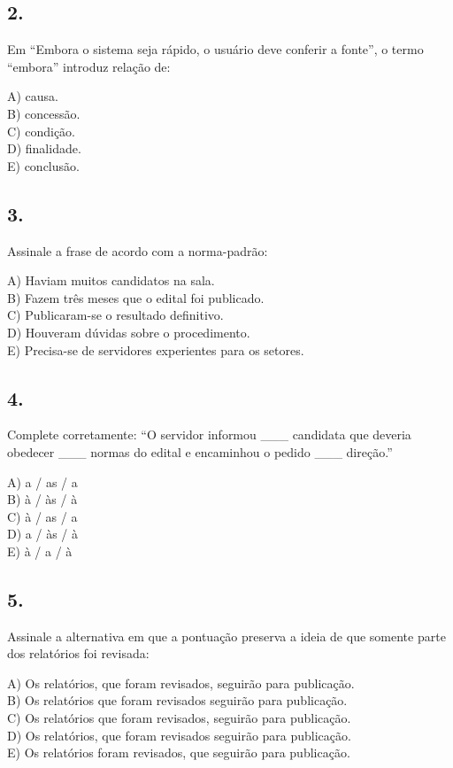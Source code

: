 \documentclass[11pt,a4paper]{article}
\begin{document}
\subsection*{2.}

Em “Embora o sistema seja rápido, o usuário deve conferir a fonte”, o termo “embora” introduz relação de:

A) causa. \\ B) concessão. \\ C) condição. \\ D) finalidade. \\ E) conclusão.

\subsection*{3.}

Assinale a frase de acordo com a norma-padrão:

A) Haviam muitos candidatos na sala. \\ B) Fazem três meses que o edital foi publicado. \\ C) Publicaram-se o resultado definitivo. \\ D) Houveram dúvidas sobre o procedimento. \\ E) Precisa-se de servidores experientes para os setores.

\subsection*{4.}

Complete corretamente: “O servidor informou \_\_\_ candidata que deveria obedecer \_\_\_ normas do edital e encaminhou o pedido \_\_\_ direção.”

A) a / as / a \\ B) à / às / à \\ C) à / as / a \\ D) a / às / à \\ E) à / a / à

\subsection*{5.}

Assinale a alternativa em que a pontuação preserva a ideia de que somente parte dos relatórios foi revisada:

A) Os relatórios, que foram revisados, seguirão para publicação. \\ B) Os relatórios que foram revisados seguirão para publicação. \\ C) Os relatórios que foram revisados, seguirão para publicação. \\ D) Os relatórios, que foram revisados seguirão para publicação. \\ E) Os relatórios foram revisados, que seguirão para publicação.
\end{document}
